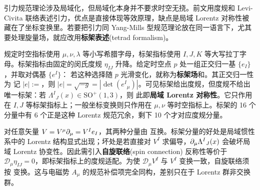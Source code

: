 引力规范理论涉及局域化，但局域化本身并不要求时空无挠。前文用度规和 Levi-Civita 联络表述引力，优点是直接体现等效原理，缺点是局域 Lorentz 对称性被藏在了坐标变换里。若要把引力同 Yang-Mills 型规范理论放在同一语言下，尤其要处理旋量场，就应改用\textbf{标架表述}(tetrad formalism)。

规定时空指标使用 $\mu,\nu,\lambda$ 等小写希腊字母，标架指标使用 $I,J,K$ 等大写拉丁字母。标架指标由固定的闵氏度规 $\eta_{IJ}$ 升降。给定时空点 $p$ 处一组正交归一基 $\{e_I\}$，并取对偶基 $\{e^I\}$：
若这种选择随 $p$ 光滑变化，就称为\textbf{标架场}和。其正交归一性为
记 $|e|:=$，则 $|e|=\sqrt{-g}=|\det(e^I{}_\mu)|$。可见标架给出度规，但度规不给出唯一标架：若 $\Lambda^I{}_J(x)\in\mathrm{SO}^+(1,3)$，则
此即\textbf{局域 Lorentz 对称性}。它只作用在 $I,J$ 等标架指标上；一般坐标变换则只作用在 $\mu,\nu$ 等时空指标上。标架的 16 个分量中有 6 个正是这种 Lorentz 规范冗余，剩下 10 个才对应度规分量。

对任意矢量 $V=V^\mu\partial_\mu=V^I e_I$，其两种分量由
互换。标架分量的好处是局域惯性系中的 Lorentz 结构显式出现；坏处是若直接对 $V^I$ 求偏导，$\partial_\mu\Lambda^I{}_J(x)$ 会破坏局域 Lorentz 协变性。因此需引入\textbf{自旋联络}(spin connection)
反称性等价于 $\mathcal D_\mu\eta_{IJ}=0$，即标架指标上的度规适配。为使 $\mathcal D_\mu V^I$ 与 $V^I$ 变换一致，自旋联络须按
变换。这与电磁势 $A_\mu$ 的规范补偿项完全同构，差别只在于 Lorentz 群非交换群。

